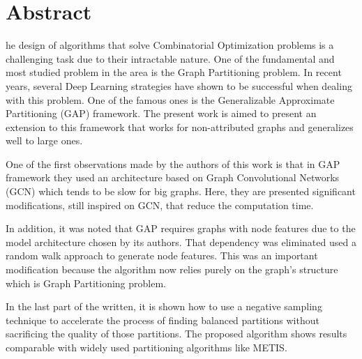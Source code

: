 

\chapter*{Abstract}

he design of algorithms that solve Combinatorial Optimization problems is a challenging task due to their intractable nature. One of the fundamental and most studied problem in the area is the Graph Partitioning problem. In recent years, several Deep Learning strategies have shown to be successful when dealing with this problem. One of the famous ones is the Generalizable Approximate Partitioning (GAP) framework. The present work is aimed to present an extension to this framework that works for non-attributed graphs and generalizes well to large ones.

One of the first observations made by the authors of this work is that in GAP framework they used an architecture based on Graph Convolutional Networks (GCN) which tends to be slow for big graphs. Here, they are presented significant modifications, still inspired on GCN, that reduce the computation time.

In addition, it was noted that GAP requires graphs with node features due to the model architecture chosen by its authors. That dependency was eliminated used a random walk approach to generate node features. This was an important modification because the algorithm now relies purely on the graph's structure which is Graph Partitioning problem.

In the last part of the written, it is shown how to use a negative sampling technique to accelerate the process of finding balanced partitions without sacrificing the quality of those partitions. The proposed algorithm shows results comparable with widely used partitioning algorithms like METIS.


\clearpage